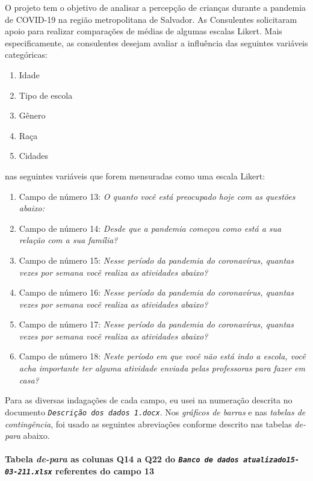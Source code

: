 \documentclass[]{article}
\providecommand{\tightlist}{%
  \setlength{\itemsep}{0pt}\setlength{\parskip}{0pt}}
\let\oldparagraph\paragraph
\renewcommand{\paragraph}[1]{\oldparagraph{#1}\mbox{}}
\begin{document}
O projeto tem o objetivo de analisar a percepção de crianças durante a pandemia de COVID-19 na região metropolitana de Salvador. As Consulentes solicitaram apoio para realizar comparações de médias de algumas escalas Likert. Mais especificamente, as consulentes desejam avaliar a influência das seguintes variáveis categóricas:

\begin{enumerate}
\def\labelenumi{\roman{enumi}.}
\tightlist
\item
  Idade
\item
  Tipo de escola
\item
  Gênero
\item
  Raça
\item
  Cidades
\end{enumerate}

nas seguintes variáveis que forem mensuradas como uma escala Likert:

\begin{enumerate}
\def\labelenumi{\roman{enumi}.}
\tightlist
\item
  Campo de número 13: \emph{O quanto você está preocupado hoje com as questões abaixo:}
\item
  Campo de número 14: \emph{Desde que a pandemia começou como está a sua relação com a sua família?}
\item
  Campo de número 15: \emph{Nesse período da pandemia do coronavírus, quantas vezes por semana você realiza as atividades abaixo?}
\item
  Campo de número 16: \emph{Nesse período da pandemia do coronavírus, quantas vezes por semana você realiza as atividades abaixo?}
\item
  Campo de número 17: \emph{Nesse período da pandemia do coronavírus, quantas vezes por semana você realiza as atividades abaixo?}
\item
  Campo de número 18: \emph{Neste período em que você não está indo a escola, você acha importante ter alguma atividade enviada pelas professoras para fazer em casa?}
\end{enumerate}

Para as diversas indagações de cada campo, eu usei na numeração descrita no documento \emph{\texttt{Descrição\ dos\ dados\ 1.docx}}. Nos \emph{gráficos de barras} e nas \emph{tabelas de contingência}, foi usado as seguintes abreviações conforme descrito nas tabelas \emph{de-para} abaixo.

\hypertarget{tabela-de-para-as-colunas-q14-a-q22-do-banco-de-dados-atualizado15-03-211.xlsx-referentes-do-campo-13}{%
\paragraph{\texorpdfstring{Tabela \emph{de-para} as colunas Q14 a Q22 do \emph{\texttt{Banco\ de\ dados\ atualizado15-03-211.xlsx}} referentes do campo 13}{Tabela de-para as colunas Q14 a Q22 do Banco de dados atualizado15-03-211.xlsx referentes do campo 13}}\label{tabela-de-para-as-colunas-q14-a-q22-do-banco-de-dados-atualizado15-03-211.xlsx-referentes-do-campo-13}}
\end{document}
